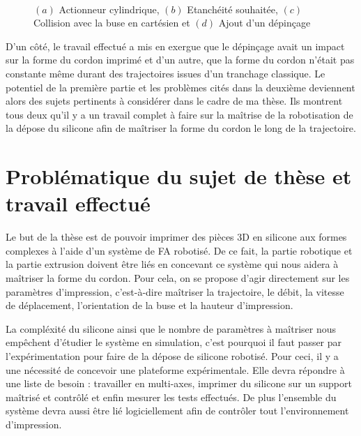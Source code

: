 \documentclass[11pt,a4paper]{article}
\begin{document}
    \begin{figure}[H]
        \centering
        \def\svgwidth{0.6\columnwidth}
        \caption{$(a)$ Actionneur cylindrique, $(b)$ Etanchéité souhaitée, $(c)$ Collision avec la buse en cartésien et $(d)$ Ajout d'un dépinçage}~\label{fig:schema_depincage}
    \end{figure}

    D'un côté, le travail effectué a mis en exergue que le dépinçage avait un impact sur la forme du cordon imprimé et d'un autre, que la  forme du cordon n'était pas constante même durant des trajectoires issues d'un tranchage classique. Le potentiel de la première partie et les problèmes cités dans la deuxième deviennent alors des sujets pertinents à considérer dans le cadre de ma thèse. Ils montrent tous deux qu'il y a un travail complet à faire sur la maîtrise de la robotisation de la dépose du silicone afin de maîtriser la forme du cordon le long de la trajectoire.


\section*{Problématique du sujet de thèse et travail effectué}
    
        Le but de la thèse est de pouvoir imprimer des pièces 3D en silicone aux formes complexes à l'aide d'un système de FA robotisé. De ce fait, la partie robotique et la partie extrusion doivent être liés en concevant ce système qui nous aidera à maîtriser la forme du cordon. Pour cela, on se propose d'agir directement sur les paramètres d'impression, c'est-à-dire maîtriser la trajectoire, le débit, la vitesse de déplacement, l'orientation de la buse et la hauteur d'impression. 

        La compléxité du silicone ainsi que le nombre de paramètres à maîtriser nous empêchent d'étudier le système en simulation, c'est pourquoi il faut passer par l'expérimentation pour faire de la dépose de silicone robotisé. Pour ceci, il y a une nécessité de concevoir une plateforme expérimentale. Elle devra répondre à une liste de besoin : travailler en multi-axes, imprimer du silicone sur un support maîtrisé et contrôlé et enfin mesurer les tests effectués. De plus l'ensemble du système devra aussi être lié logiciellement afin de contrôler tout l'environnement d'impression.  
        
\end{document}
